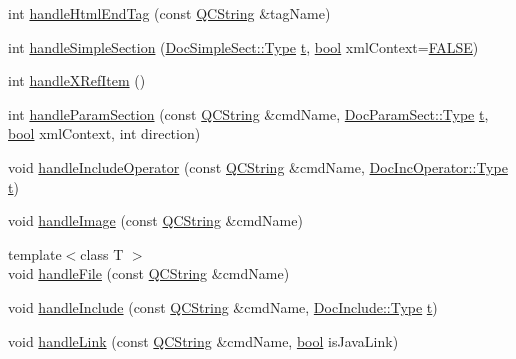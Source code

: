 \begin{DoxyCompactItemize}
int \hyperlink{class_doc_para_aa71f61738c3992d1e6be47e944995f06}{handle\+Html\+End\+Tag} (const \hyperlink{class_q_c_string}{Q\+C\+String} \&tag\+Name)
\item 
int \hyperlink{class_doc_para_a027e048f1d5674b5200427ff2ee27e7f}{handle\+Simple\+Section} (\hyperlink{class_doc_simple_sect_a3b9f9dd4952f3d819b347f74a6769a9b}{Doc\+Simple\+Sect\+::\+Type} \hyperlink{058__bracket__recursion_8tcl_a69e959f6901827e4d8271aeaa5fba0fc}{t}, \hyperlink{qglobal_8h_a1062901a7428fdd9c7f180f5e01ea056}{bool} xml\+Context=\hyperlink{qglobal_8h_a10e004b6916e78ff4ea8379be80b80cc}{F\+A\+L\+S\+E})
\item 
int \hyperlink{class_doc_para_a722190df7921222d83cce8c64ac67cee}{handle\+X\+Ref\+Item} ()
\item 
int \hyperlink{class_doc_para_a313d4a548cc38e2d374a38b276fa86a0}{handle\+Param\+Section} (const \hyperlink{class_q_c_string}{Q\+C\+String} \&cmd\+Name, \hyperlink{class_doc_param_sect_a402e8723e8b9f22c5ffa84046224d51a}{Doc\+Param\+Sect\+::\+Type} \hyperlink{058__bracket__recursion_8tcl_a69e959f6901827e4d8271aeaa5fba0fc}{t}, \hyperlink{qglobal_8h_a1062901a7428fdd9c7f180f5e01ea056}{bool} xml\+Context, int direction)
\item 
void \hyperlink{class_doc_para_a7c235343a063e005bfee6c68b14a835e}{handle\+Include\+Operator} (const \hyperlink{class_q_c_string}{Q\+C\+String} \&cmd\+Name, \hyperlink{class_doc_inc_operator_ae7a155da5a206f51e93edc166bd64970}{Doc\+Inc\+Operator\+::\+Type} \hyperlink{058__bracket__recursion_8tcl_a69e959f6901827e4d8271aeaa5fba0fc}{t})
\item 
void \hyperlink{class_doc_para_a8984fc90ebc2e60c3d472d39d4eb6f94}{handle\+Image} (const \hyperlink{class_q_c_string}{Q\+C\+String} \&cmd\+Name)
\item 
{\footnotesize template$<$class T $>$ }\\void \hyperlink{class_doc_para_a2c5971c7bbbb5bd01e02ac7d93600281}{handle\+File} (const \hyperlink{class_q_c_string}{Q\+C\+String} \&cmd\+Name)
\item 
void \hyperlink{class_doc_para_a1bb9289a32b8c06de83c728786bb0669}{handle\+Include} (const \hyperlink{class_q_c_string}{Q\+C\+String} \&cmd\+Name, \hyperlink{class_doc_include_a72aa0fd397546547aadf356348ff3eaf}{Doc\+Include\+::\+Type} \hyperlink{058__bracket__recursion_8tcl_a69e959f6901827e4d8271aeaa5fba0fc}{t})
\item 
void \hyperlink{class_doc_para_a0bff680b96bc9c76b2228affeaa90bbb}{handle\+Link} (const \hyperlink{class_q_c_string}{Q\+C\+String} \&cmd\+Name, \hyperlink{qglobal_8h_a1062901a7428fdd9c7f180f5e01ea056}{bool} is\+Java\+Link)

\end{DoxyCompactItemize}

